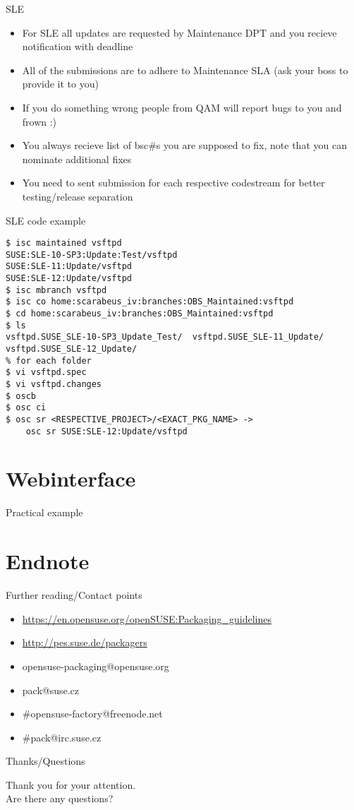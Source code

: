 \documentclass{beamer}
\begin{document}
\begin{frame}[t]{SLE}
	\begin{itemize}
	\item For SLE all updates are requested by Maintenance DPT and you recieve notification with deadline
	\item All of the submissions are to adhere to Maintenance SLA (ask your boss to provide it to you)
	\item If you do something wrong people from QAM will report bugs to you and frown :)
	\item You always recieve list of bsc\#s you are supposed to fix, note that you can nominate additional fixes
	\item You need to sent submission for each respective codestream for better testing/release separation
	\end{itemize}
\end{frame}

\begin{frame}[fragile]{SLE code example}
	\begin{tiny}
	\begin{verbatim}
$ isc maintained vsftpd
SUSE:SLE-10-SP3:Update:Test/vsftpd
SUSE:SLE-11:Update/vsftpd
SUSE:SLE-12:Update/vsftpd
$ isc mbranch vsftpd
$ isc co home:scarabeus_iv:branches:OBS_Maintained:vsftpd
$ cd home:scarabeus_iv:branches:OBS_Maintained:vsftpd
$ ls
vsftpd.SUSE_SLE-10-SP3_Update_Test/  vsftpd.SUSE_SLE-11_Update/ vsftpd.SUSE_SLE-12_Update/
% for each folder
$ vi vsftpd.spec
$ vi vsftpd.changes
$ oscb
$ osc ci
$ osc sr <RESPECTIVE_PROJECT>/<EXACT_PKG_NAME> ->
	osc sr SUSE:SLE-12:Update/vsftpd
	\end{verbatim}
	\end{tiny}
\end{frame}

\section{Webinterface}

\begin{frame}{Practical example}
\end{frame}

\section{Endnote}

\begin{frame}[t]{Further reading/Contact points}
	\begin{itemize}
	\item \url{https://en.opensuse.org/openSUSE:Packaging\_guidelines}
	\item \url{http://pes.suse.de/packagers}
	\item opensuse-packaging@opensuse.org
	\item pack@suse.cz
	\item \#opensuse-factory@freenode.net 
	\item \#pack@irc.suse.cz
	\end{itemize}
\end{frame}

\begin{frame}{Thanks/Questions}
	\begin{center}
	Thank you for your attention.\\
	Are there any questions?
	\end{center}
\end{frame}
\end{document}
